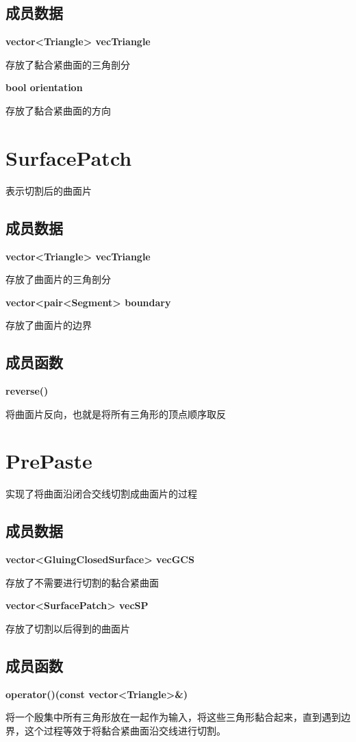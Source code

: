 \documentclass[a4paper]{book}
\numberwithin{equation}{chapter}
\theoremstyle{definition}
\begin{document}
\subsection{成员数据}
\textbf{vector<Triangle> vecTriangle}

存放了黏合紧曲面的三角剖分

\textbf{bool orientation}

存放了黏合紧曲面的方向

\section{SurfacePatch}
表示切割后的曲面片

\subsection{成员数据}
\textbf{vector<Triangle> vecTriangle}

存放了曲面片的三角剖分

\textbf{vector<pair<Segment> boundary}

存放了曲面片的边界

\subsection{成员函数}
\textbf{reverse()}

将曲面片反向，也就是将所有三角形的顶点顺序取反


\section{PrePaste}
实现了将曲面沿闭合交线切割成曲面片的过程


\subsection{成员数据}
\textbf{vector<GluingClosedSurface> vecGCS}

存放了不需要进行切割的黏合紧曲面

\textbf{vector<SurfacePatch> vecSP}

存放了切割以后得到的曲面片

\subsection{成员函数}
\textbf{operator()(const vector<Triangle>\&)}

将一个殷集中所有三角形放在一起作为输入，将这些三角形黏合起来，直到遇到边界，这个过程等效于将黏合紧曲面沿交线进行切割。
\end{document}
